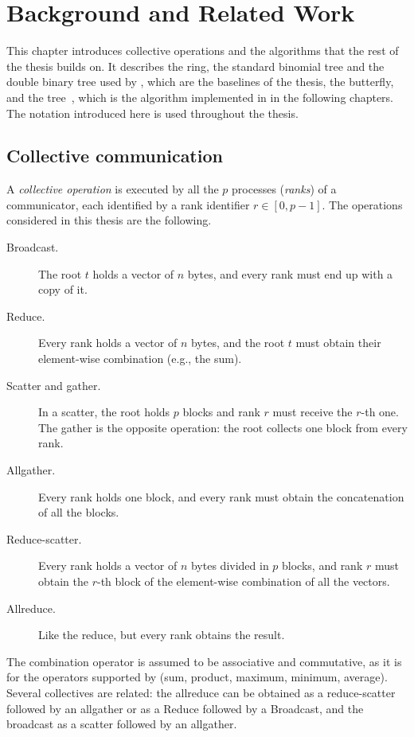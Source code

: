 \chapter{Background and Related Work}\label{ch:background}

This chapter introduces collective operations and the algorithms that the rest of the thesis builds on.
It describes the ring, the standard binomial tree and the double binary tree used by \nccl{}, which are the baselines of the thesis, the butterfly, and the \bine{} tree~\cite{desensi2025bine}, which is the algorithm implemented in \nccl{} in the following chapters.
The notation introduced here is used throughout the thesis.

\section{Collective communication}\label{sec:bg-collectives}

A \emph{collective operation} is executed by all the $p$ processes (\emph{ranks}) of a communicator, each identified by a rank identifier $r\in[0,p-1]$.
The operations considered in this thesis are the following.
\begin{description}
  \item[Broadcast.] The root $t$ holds a vector of $n$ bytes, and every rank must end up with a copy of it.
  \item[Reduce.] Every rank holds a vector of $n$ bytes, and the root $t$ must obtain their element-wise combination (e.g., the sum).
  \item[Scatter and gather.] In a scatter, the root holds $p$ blocks and rank $r$ must receive the $r$-th one. The gather is the opposite operation: the root collects one block from every rank.
  \item[Allgather.] Every rank holds one block, and every rank must obtain the concatenation of all the blocks.
  \item[Reduce-scatter.] Every rank holds a vector of $n$ bytes divided in $p$ blocks, and rank $r$ must obtain the $r$-th block of the element-wise combination of all the vectors.
  \item[Allreduce.] Like the reduce, but every rank obtains the result.
\end{description}
The combination operator is assumed to be associative and commutative, as it is for the operators supported by \nccl{} (sum, product, maximum, minimum, average).
Several collectives are related: the allreduce can be obtained as a reduce-scatter followed by an allgather or as a Reduce followed by a Broadcast, and the broadcast as a scatter followed by an allgather.


